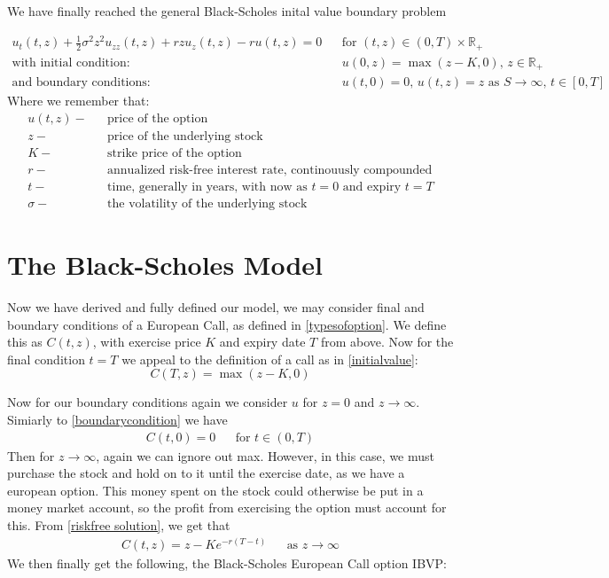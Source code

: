 \documentclass[11pt]{article} %
\begin{document}
We have finally reached the general Black-Scholes inital value boundary problem

\begin{align}
    u_t(t,z) +\frac{1}{2}\sigma^2z^2u_{zz}(t,z) + rzu_z(t,z) - ru(t,z) = 0 &&
    \text{for $(t,z) \in (0,T) \times \mathbb{R}_+ $}\\
    \text{with initial condition: } && u(0,z) = \max{(z-K, 0)} \text{, } 
    z \in \mathbb{R}_+ \\
    \text{and boundary conditions: } && u(t, 0) = 0 \text{,  $u(t,z) = z$ as 
    $S \to \infty $,  $t \in [0,T]$}
\end{align}
Where we remember that: 
\begin{align}
    u(t,z) - && \text{price of the option}\\
    z - && \text{price of the underlying stock}\\
    K - && \text{strike price of the option}\\
    r - && \text{annualized risk-free interest rate, continouusly compounded}\\
    t - && \text{time, generally in years, with now as $t=0$ and expiry $t=T$}\\
    \sigma - && \text{the volatility of the underlying stock}
\end{align}
\section{The Black-Scholes Model}
Now we have derived and fully defined our model, we may consider final and boundary 
conditions of a European Call, as defined in \ref{typesofoption}. We define this as 
$C(t,z)$, with exercise price $K$ and expiry date $T$ from above. Now for the final 
condition $t=T$ we appeal to the definition of a call as in \ref{initialvalue}:
\begin{equation}
    C(T, z) = \max{(z-K, 0)}
\end{equation}

Now for our boundary conditions again we consider $u$ for $z=0$ and $z \to \infty$. Simiarly 
to \ref{boundarycondition} we have 
\begin{align}
    C(t, 0) = 0 &&\text{for } t \in (0,T)
\end{align}
Then for $z \to \infty$, again we can ignore out max. However, in this case, we must 
purchase the stock and hold on to it until the exercise date, as we have a 
european option. This money spent on the stock could otherwise be put in a 
money market account, so the profit from exercising the option must account for this.
From \ref{riskfree solution}, we get that 
\begin{align}
    C(t,z) = z - Ke^{-r(T-t)} &&\text{as } z \to \infty
\end{align}
We then finally get the following, the Black-Scholes European Call option IBVP:
\end{document}
